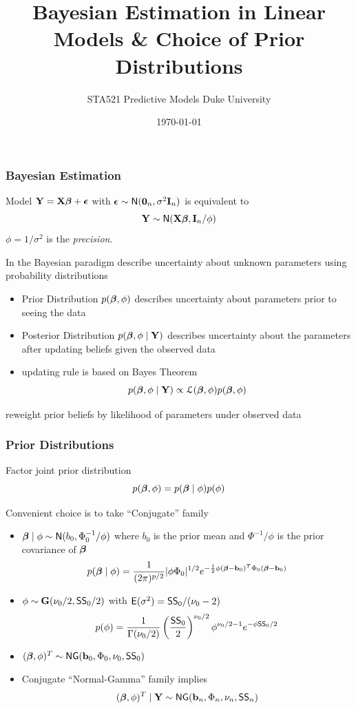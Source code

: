 \documentclass[handout]{beamer}\usepackage[]{graphicx}\usepackage[]{color}
\title{Bayesian Estimation in Linear Models \& Choice of Prior Distributions}
\institute{Merlise Clyde}
\author{STA521 Predictive Models Duke University}
\date{\today}
\begin{document}
\maketitle

\begin{frame} \frametitle{Bayesian Estimation}
  Model $\mathbf{Y} = \mathbf{X} \boldsymbol{\beta} + \boldsymbol{\epsilon}$  with $\boldsymbol{\epsilon} \sim \textsf{N}(\mathbf{0}_n , \sigma^2
  \mathbf{I}_n)$ \pause
is equivalent to
$$
\mathbf{Y} \sim \textsf{N}(\mathbf{X} \boldsymbol{\beta}, \mathbf{I}_n/\phi)
$$
\pause
 $\phi = 1/\sigma^2$ is the {\it precision}.
\pause

\vspace{14pt}
In the  Bayesian paradigm describe uncertainty about unknown
parameters using probability distributions
\pause
\begin{itemize}
\item  Prior Distribution $p(\boldsymbol{\beta}, \phi)$ describes uncertainty about
  parameters prior to seeing the data \pause
\item Posterior Distribution $p(\boldsymbol{\beta}, \phi \mid \mathbf{Y})$ describes
  uncertainty about the parameters after updating  beliefs given the
  observed data \pause
\item updating rule is based on Bayes Theorem
$$p(\boldsymbol{\beta}, \phi \mid \mathbf{Y}) \propto {\cal{L}}(\boldsymbol{\beta}, \phi) p(\boldsymbol{\beta}, \phi)$$
\pause
\end{itemize}
 reweight prior beliefs by likelihood of parameters  under observed data
\end{frame}


\begin{frame} \frametitle{Prior Distributions}
Factor joint prior distribution  $$p(\boldsymbol{\beta}, \phi) = p(\boldsymbol{\beta} \mid \phi) p(\phi)$$
\pause

Convenient choice is to take ``Conjugate'' family \pause
\begin{itemize}
\item $\boldsymbol{\beta} \mid \phi \sim \textsf{N}(b_0, \Phi_0^{-1}/\phi)$ where $b_0$ is the prior
  mean and $\Phi^{-1}/\phi$ is the prior covariance of $\boldsymbol{\beta}$
$$
p(\boldsymbol{\beta} \mid \phi) = \frac{1}{(2 \pi)^{p/2}} | \phi \Phi_0|^{1/2} e^{- \frac{1}{2}\phi (\boldsymbol{\beta} - \mathbf{b}_0)^T \Phi_0 (\boldsymbol{\beta} - \mathbf{b}_0)}
$$
\pause
\item $\phi \sim \mathbf{G}( \nu_0/2, \textsf{SS}_0/2)$  with $\textsf{E}(\sigma^2) =
  \textsf{SS}_0/(\nu_0 - 2)$ \pause
$$p(\phi) = \frac{1}{\Gamma{(\nu_0/2)}}
\left(\frac{\textsf{SS}_0}{2} \right)^{\nu_0/2}
\phi^{\nu_0/2 - 1}
 e^{- \phi \textsf{SS}_0/2}
 $$\pause
\item $(\boldsymbol{\beta}, \phi)^T \sim \textsf{NG}(\mathbf{b}_0, \Phi_0, \nu_0, \textsf{SS}_0)$ \pause
\item Conjugate  ``Normal-Gamma'' family implies \pause
$$(\boldsymbol{\beta}, \phi)^T \mid \mathbf{Y} \sim \textsf{NG}(\mathbf{b}_n, \Phi_n, \nu_n, \textsf{SS}_n)$$
\end{itemize}
\end{frame}
\end{document}
